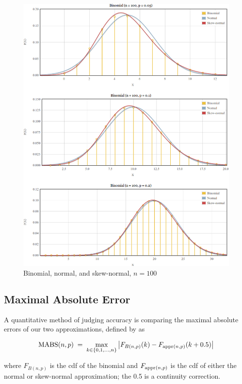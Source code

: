 \documentclass{article}
\begin{document}
\begin{figure}
  \centering
  \includegraphics[width=\textwidth]{../images/comparison-n100.png}
  \caption{Binomial, normal, and skew-normal, $n=100$}
  \label{fig:comparison-n100}
\end{figure}

\subsection{Maximal Absolute Error}

A quantitative method of judging accuracy is comparing the maximal absolute
errors of our two approximations, defined by \citet{mabs} as

\begin{equation}
  \textnormal{MABS}(n, p) \;=\; \max_{k \in \{0, 1,...,n\}} \left| F_{B(n,p)} (k) -  F_{\textnormal{appr}(n,p)}(k + 0.5) \right|
\end{equation}

where $F_{B(n,p)}$ is the cdf of the binomial and $F_{\textnormal{appr}(n,p)}$
is the cdf of either the normal or skew-normal approximation; the 0.5 is a
continuity correction.
\end{document}

